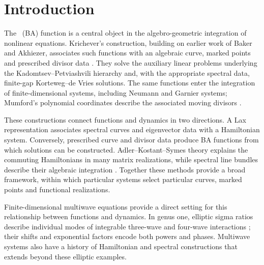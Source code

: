 \section{Introduction}

The \BA\ (BA) function is a central object in the algebro-geometric
integration of nonlinear equations. Krichever's construction, building
on earlier work of Baker and Akhiezer, associates such functions with
an algebraic curve, marked points and prescribed divisor data
\cite{Krichever1977,KricheverShiota2011}. They solve the auxiliary
linear problems underlying the Kadomtsev--Petviashvili hierarchy and,
with the appropriate spectral data, finite-gap Korteweg--de Vries
solutions. The same functions enter the integration of
finite-dimensional systems, including Neumann and Garnier systems;
Mumford's polynomial coordinates describe the associated moving
divisors \cite{Kostov1999,Eilbeck2000,Mumford1984,Vanhaecke2001}.

These constructions connect functions and dynamics in two directions.
A Lax representation associates spectral curves and eigenvector data
with a Hamiltonian system. Conversely, prescribed curve and divisor
data produce BA functions from which solutions can be constructed.
Adler--Kostant--Symes theory explains the commuting Hamiltonians in
many matrix realizations, while spectral line bundles describe their
algebraic integration \cite{AdlerVanMoerbeke2018,Beauville1990}.
Together these methods provide a broad framework, within which
particular systems select particular curves, marked points and
functional realizations.

Finite-dimensional multiwave equations provide a direct setting for
this relationship between functions and dynamics. In genus one,
elliptic sigma ratios describe individual modes of integrable
three-wave and four-wave interactions
\cite{Hesketh2015,HeskethFWM2026}; their shifts and exponential factors
encode both powers and phases. Multiwave systems also have a history
of Hamiltonian and spectral constructions that extends beyond these
elliptic examples.

